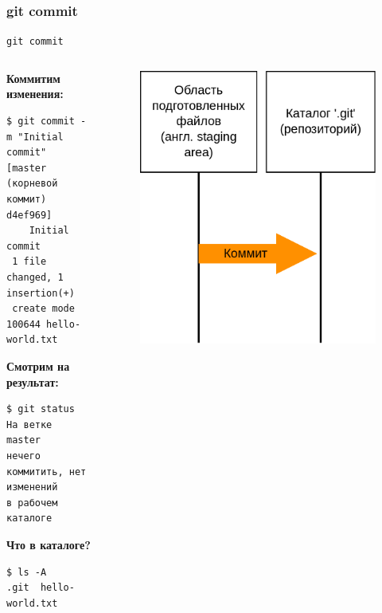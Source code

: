\documentclass[presentation]{beamer}
\begin{document}


\subsubsection{git commit}

\begin{frame}[fragile]{\texttt{git commit}}
  \begin{columns}
    \begin{column}{0.6\textwidth}
      \textbf{Коммитим изменения:}
\begin{verbatim}
$ git commit -m "Initial commit"
[master (корневой коммит) d4ef969]
    Initial commit
 1 file changed, 1 insertion(+)
 create mode 100644 hello-world.txt
\end{verbatim}
      \textbf{Смотрим на результат:}
\begin{verbatim}
$ git status
На ветке master
нечего коммитить, нет изменений
в рабочем каталоге
\end{verbatim}
  \textbf{Что в каталоге?}
\begin{verbatim}
$ ls -A
.git  hello-world.txt
\end{verbatim}
    \end{column}
    \begin{column}{0.4\textwidth}
      \begin{figure}[htb]
        \centering
        \includegraphics[width=1\textwidth]{git-operation-commit}
      \end{figure}
    \end{column}
  \end{columns}
\end{frame}
\end{document}
